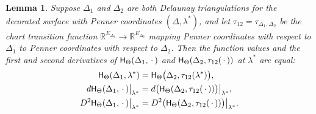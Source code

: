 \documentclass[a4paper, 11pt]{article}
\newcommand{\R}{\mathbb{R}}
\newcommand{\Hsf}{\scalebox{0.94}{$\mathsf{H}$}}
\theoremstyle{plain}
\newtheorem{lemma}[theorem]{Lemma}
\theoremstyle{definition}
\begin{document}
\begin{lemma}
  \label{lem:Hsf}
  Suppose $\Delta_{1}$ and $\Delta_{2}$ are both Delaunay
  triangulations for the decorated surface with Penner coordinates
  $(\Delta,\lambda^{*})$, and let
  $\tau_{12}=\tau_{\Delta_{1},\Delta_{2}}$ be the chart transition
  function $\R^{E_{\Delta_{1}}}\rightarrow\R^{E_{\Delta_{2}}}$ mapping
  Penner coordinates with respect to $\Delta_{1}$ to Penner
  coordinates with respect to $\Delta_{2}$. Then the function values
  and the first and second derivatives of
  $\Hsf_{\Theta}(\Delta_{1},\,\cdot\,)$ and
  $\Hsf_{\Theta}(\Delta_{2},\tau_{12}(\,\cdot\,))$ at $\lambda^{*}$
  are equal:
  \begin{align}
    \label{eq:Hsfflip}
    \Hsf_{\Theta}(\Delta_{1},\lambda^{*})
    &=\Hsf_{\Theta}\big(\Delta_{2},\tau_{12}(\lambda^{*})\big),\\
    \label{eq:dHsfflip}
    d\Hsf_{\Theta}(\Delta_{1},\,\cdot\,)\big|_{\lambda^{*}}
    &=d\big(\Hsf_{\Theta}(\Delta_{2},\tau_{12}(\,\cdot\,))\big)
      \big|_{\lambda^{*}},\\
    \label{eq:d2Hsfflip}
    D^{2}\Hsf_{\Theta}(\Delta_{1},\,\cdot\,)\big|_{\lambda^{*}}
    &=D^{2}\big(\Hsf_{\Theta}(\Delta_{2},\tau_{12}(\,\cdot\,))\big)
      \big|_{\lambda^{*}}.
  \end{align}
\end{lemma}
\end{document}
